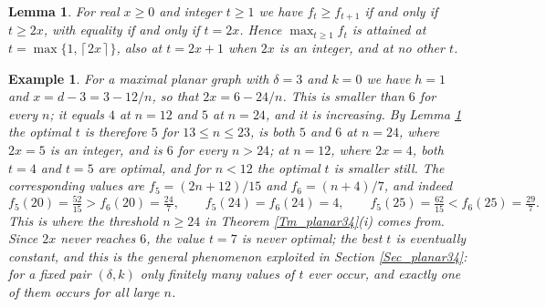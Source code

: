 \documentclass[10pt,a4paper]{article}
\newtheorem{example}[theorem]{Example}
\newtheorem{lemma}[theorem]{Lemma}
\begin{document}



\begin{lemma}
\label{Lemma_bestt}For real $x\geq 0$ and integer $t\geq 1$ we have $f_{t}\geq f_{t+1}$ if and only
if $t\geq 2x$, with equality if and only if $t=2x$. Hence $\max_{t\geq 1}f_{t}$ is attained at
$t=\max \{1,\left\lceil 2x\right\rceil \}$, also at $t=2x+1$ when $2x$ is an integer, and at no
other $t$.
\end{lemma}

\begin{example}
\label{Ex_bestt}For a maximal planar graph with $\delta =3$ and $k=0$ we have
$h=1$ and $x=d-3=3-12/n$, so that $2x=6-24/n$. This is smaller than $6$ for
every $n$; it equals $4$ at $n=12$ and $5$ at $n=24$, and it is increasing. By
Lemma \ref{Lemma_bestt} the optimal $t$ is therefore $5$ for $13\leq n\leq 23$,
is both $5$ and $6$ at $n=24$, where $2x=5$ is an integer, and is $6$ for every
$n>24$; at $n=12$, where $2x=4$, both $t=4$ and $t=5$ are optimal, and for
$n<12$ the optimal $t$ is smaller still. The corresponding values are
$f_{5}=(2n+12)/15$ and $f_{6}=(n+4)/7$, and indeed
\[
f_{5}(20)=\tfrac{52}{15}>f_{6}(20)=\tfrac{24}{7},\qquad f_{5}(24)=f_{6}%
(24)=4,\qquad f_{5}(25)=\tfrac{62}{15}<f_{6}(25)=\tfrac{29}{7}.
\]
This is where the threshold $n\geq 24$ in Theorem \ref{Tm_planar34}(i) comes
from. Since $2x$ never reaches $6$, the value $t=7$ is never optimal; the best
$t$ is eventually constant, and this is the general phenomenon exploited in
Section \ref{Sec_planar34}: for a fixed pair $(\delta ,k)$ only finitely many
values of $t$ ever occur, and exactly one of them occurs for all large $n$.
\end{example}
\end{document}

